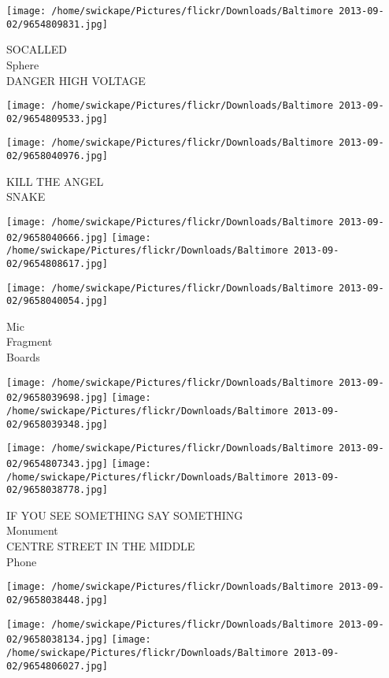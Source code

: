 \documentclass[10pt,letterpaper]{article}
\begin{document}
\texttt{[image: /home/swickape/Pictures/flickr/Downloads/Baltimore 2013-09-02/9654809831.jpg]}

SOCALLED\\
Sphere\\
DANGER HIGH VOLTAGE\\
\pagebreak

\texttt{[image: /home/swickape/Pictures/flickr/Downloads/Baltimore 2013-09-02/9654809533.jpg]}

\vspace{0.25in}
\texttt{[image: /home/swickape/Pictures/flickr/Downloads/Baltimore 2013-09-02/9658040976.jpg]}

KILL THE ANGEL\\
SNAKE\\
\pagebreak

\texttt{[image: /home/swickape/Pictures/flickr/Downloads/Baltimore 2013-09-02/9658040666.jpg]}
\texttt{[image: /home/swickape/Pictures/flickr/Downloads/Baltimore 2013-09-02/9654808617.jpg]}

\vspace{0.25in}
\texttt{[image: /home/swickape/Pictures/flickr/Downloads/Baltimore 2013-09-02/9658040054.jpg]}

Mic\\
Fragment\\
Boards\\
\pagebreak

\texttt{[image: /home/swickape/Pictures/flickr/Downloads/Baltimore 2013-09-02/9658039698.jpg]}
\texttt{[image: /home/swickape/Pictures/flickr/Downloads/Baltimore 2013-09-02/9658039348.jpg]}

\texttt{[image: /home/swickape/Pictures/flickr/Downloads/Baltimore 2013-09-02/9654807343.jpg]}
\texttt{[image: /home/swickape/Pictures/flickr/Downloads/Baltimore 2013-09-02/9658038778.jpg]}

IF YOU SEE SOMETHING SAY SOMETHING\\
Monument\\
CENTRE STREET IN THE MIDDLE\\
Phone\\
\pagebreak

\texttt{[image: /home/swickape/Pictures/flickr/Downloads/Baltimore 2013-09-02/9658038448.jpg]}

\vspace{0.25in}
\texttt{[image: /home/swickape/Pictures/flickr/Downloads/Baltimore 2013-09-02/9658038134.jpg]}
\texttt{[image: /home/swickape/Pictures/flickr/Downloads/Baltimore 2013-09-02/9654806027.jpg]}
\end{document}
